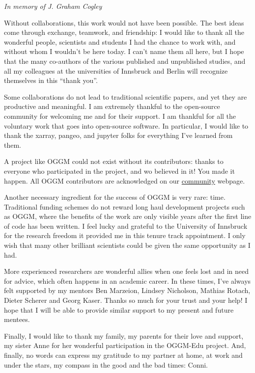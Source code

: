 
\textit{In memory of J. Graham Cogley}

\vspace{1cm}

Without collaborations, this work would not have been possible.
The best ideas come through exchange, teamwork, and friendship: I would like to
thank all the wonderful people, scientists and students I had the chance
to work with, and without whom I wouldn’t be here today. I can’t name them all here,
but I hope that the many co-authors of the various published and unpublished studies,
and all my colleagues at the universities of Innsbruck and Berlin will recognize themselves in this “thank you”.

Some collaborations do not lead to traditional scientific papers, and yet they
are productive and meaningful. I am extremely thankful
to the open-source community for welcoming me and for their support. I am thankful
for all the voluntary work that goes into open-source software. In particular,
I would like to thank the xarray, pangeo, and jupyter folks for everything
I’ve learned from them.

A project like OGGM could not exist without its contributors: thanks to everyone
who participated in the project, and wo believed in it! You made it happen.
All OGGM contributors are acknowledged on our \href{https://oggm.org/community}{community} webpage.

Another necessary ingredient for the success of OGGM is very rare: time.
Traditional funding schemes do not reward long haul development projects such as OGGM, where the benefits
of the work are only visible years after the first line of code has been written. I feel lucky and grateful
to the University of Innsbruck for the research freedom it provided me in this tenure track appointment.
I only wish that many other brilliant scientists could be given the same opportunity as I had.

More experienced researchers are wonderful allies when one feels lost and in need for advice,
which often happens in an academic career.
In these times, I’ve always felt supported by my mentors Ben Marzeion, Lindsey Nicholson,
Mathias Rotach, Dieter Scherer and Georg Kaser. Thanks so much for your trust and your help!
I hope that I will be able to provide similar support to my present and future mentees.

Finally, I would like to thank my family, my parents for their love and support, my sister Anne for her wonderful
participation in the OGGM-Edu project. And, finally, no words can express my gratitude to my partner
at home, at work and under the stars, my compass in the good and the bad times: Conni.